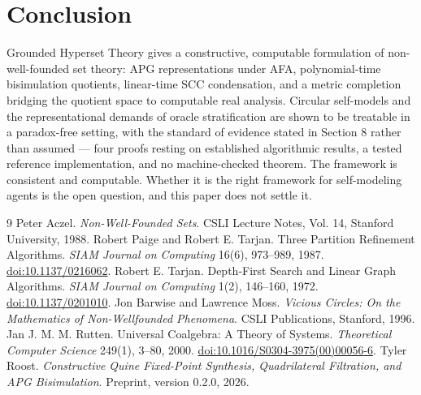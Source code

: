 \documentclass[11pt]{article}
\theoremstyle{definition}
\begin{document}
\section{Conclusion}
Grounded Hyperset Theory gives a constructive, computable formulation of non-well-founded set theory: APG representations under AFA, polynomial-time bisimulation quotients, linear-time SCC condensation, and a metric completion bridging the quotient space to computable real analysis. Circular self-models and the representational demands of oracle stratification are shown to be treatable in a paradox-free setting, with the standard of evidence stated in Section 8 rather than assumed --- four proofs resting on established algorithmic results, a tested reference implementation, and no machine-checked theorem. The framework is consistent and computable. Whether it is the right framework for self-modeling agents is the open question, and this paper does not settle it.

\begin{thebibliography}{9}
\small
{} Peter Aczel. \emph{Non-Well-Founded Sets}. CSLI Lecture Notes, Vol. 14, Stanford University, 1988.
 Robert Paige and Robert E. Tarjan. Three Partition Refinement Algorithms. \emph{SIAM Journal on Computing} 16(6), 973--989, 1987. \href{https://doi.org/10.1137/0216062}{doi:10.1137/0216062}.
 Robert E. Tarjan. Depth-First Search and Linear Graph Algorithms. \emph{SIAM Journal on Computing} 1(2), 146--160, 1972. \href{https://doi.org/10.1137/0201010}{doi:10.1137/0201010}.
 Jon Barwise and Lawrence Moss. \emph{Vicious Circles: On the Mathematics of Non-Wellfounded Phenomena}. CSLI Publications, Stanford, 1996.
 Jan J. M. M. Rutten. Universal Coalgebra: A Theory of Systems. \emph{Theoretical Computer Science} 249(1), 3--80, 2000. \href{https://doi.org/10.1016/S0304-3975(00)00056-6}{doi:10.1016/S0304-3975(00)00056-6}.
 Tyler Roost. \emph{Constructive Quine Fixed-Point Synthesis, Quadrilateral Filtration, and APG Bisimulation}. Preprint, version 0.2.0, 2026.
\end{thebibliography}
\end{document}
